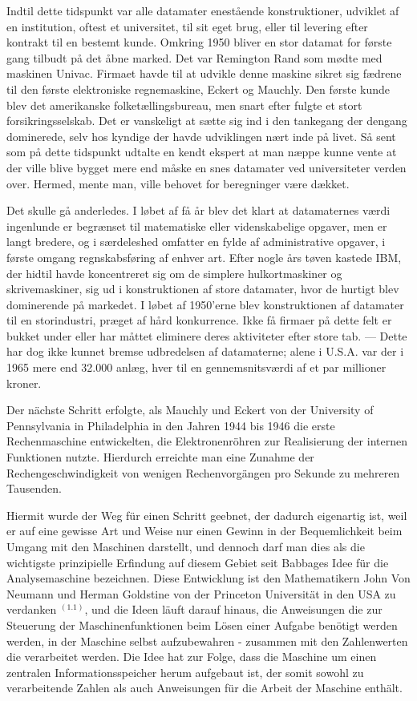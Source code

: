 {Indtil dette tidspunkt var alle datamater enestående konstruktioner, udviklet af en institution, oftest et universitet, til sit eget brug, eller til levering efter kontrakt til en bestemt kunde. Omkring 1950 bliver en stor datamat for første gang tilbudt på det åbne marked. Det var Remington Rand som mødte med maskinen Univac. Firmaet havde til at udvikle denne maskine sikret sig fædrene til den første elektroniske regnemaskine, Eckert og Mauchly. Den første kunde blev det amerikanske folketællingsbureau, men snart efter fulgte et stort forsikringsselskab. Det er vanskeligt at sætte sig ind i den tankegang der dengang dominerede, selv hos kyndige der havde udviklingen nært inde på livet. Så sent som på dette tidspunkt udtalte en kendt ekspert at man næppe kunne vente at der ville blive bygget mere end måske en snes datamater ved universiteter verden over. Hermed, mente man, ville behovet for beregninger være dækket. 

Det skulle gå anderledes. I løbet af få år blev det klart at datamaternes værdi ingenlunde er begrænset til matematiske eller videnskabelige opgaver, men er langt bredere, og i særdeleshed omfatter en fylde af administrative opgaver, i første omgang regnskabsføring af enhver art. Efter nogle års tøven kastede IBM, der hidtil havde koncentreret sig om de simplere hulkortmaskiner og skrivemaskiner, sig ud i konstruktionen af store datamater, hvor de hurtigt blev dominerende på markedet. I løbet af 1950'erne blev konstruktionen af datamater til en storindustri, præget af hård konkurrence. Ikke få firmaer på dette felt er bukket under eller har måttet eliminere deres aktiviteter efter store tab. — Dette har dog ikke kunnet bremse udbredelsen af datamaterne; alene i U.S.A. var der i 1965 mere end 32.000 anlæg, hver til en gennemsnitsværdi af et par millioner kroner. 

}{
Der nächste Schritt erfolgte, als Mauchly und Eckert von der University of Pennsylvania in Philadelphia in den Jahren 1944 bis 1946 die erste Rechenmaschine entwickelten, die Elektronenröhren zur Realisierung der internen Funktionen nutzte. Hierdurch erreichte man eine Zunahme der Rechengeschwindigkeit von wenigen Rechenvorgängen pro Sekunde zu mehreren Tausenden.

Hiermit wurde der Weg für einen Schritt geebnet, der dadurch eigenartig ist, weil er auf eine gewisse Art und Weise nur einen Gewinn in der Bequemlichkeit beim Umgang mit den Maschinen darstellt, und dennoch darf man dies als die wichtigste prinzipielle Erfindung auf diesem Gebiet seit Babbages Idee für die Analysemaschine bezeichnen.
Diese Entwicklung ist den Mathematikern John Von Neumann und Herman Goldstine von der Princeton Universität in den USA zu verdanken $^{(1.1)}$, und die Ideen läuft darauf hinaus, die Anweisungen die zur Steuerung der Maschinenfunktionen beim Lösen einer Aufgabe benötigt werden  werden, in der Maschine selbst aufzubewahren - zusammen mit den Zahlenwerten die verarbeitet werden. Die Idee hat zur Folge, dass die Maschine um einen zentralen Informationsspeicher herum aufgebaut ist, der somit sowohl zu verarbeitende Zahlen als auch Anweisungen für die Arbeit der Maschine enthält.

}
